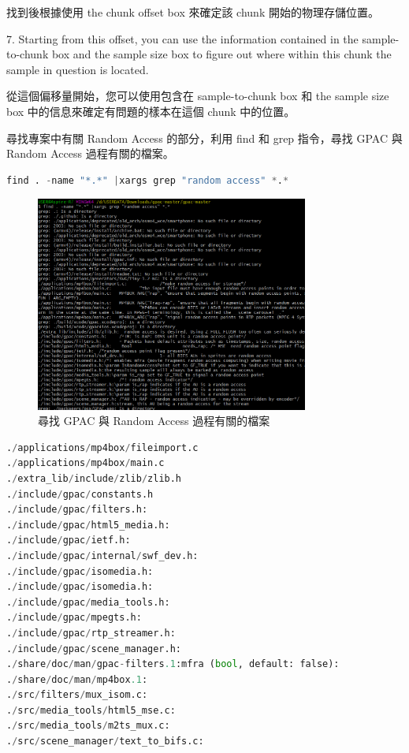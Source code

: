\documentclass[10pt,UTF8]{ctexart}
\begin{document}
找到後根據使用 the chunk offset box 來確定該 chunk 開始的物理存儲位置。

7. Starting from this offset, you can use the information contained in the sample-to-chunk box and the sample size box to figure out where within this chunk the sample in question is located.

從這個偏移量開始，您可以使用包含在 sample-to-chunk box 和 the sample size box 中的信息來確定有問題的樣本在這個 chunk 中的位置。

尋找專案中有關 Random Access 的部分，利用 find 和 grep 指令，尋找 GPAC 與 Random Access 過程有關的檔案。


\begin{lstlisting}[language={python}]
find . -name "*.*" |xargs grep "random access" *.*
\end{lstlisting}

\begin{figure}[H]
\centering 
\includegraphics[width=0.80\textwidth]{g6.png} 
\caption{尋找 GPAC 與 Random Access 過程有關的檔案}
\label{Test}
\end{figure}

\begin{lstlisting}[language={python}]
./applications/mp4box/fileimport.c
./applications/mp4box/main.c
./extra_lib/include/zlib/zlib.h
./include/gpac/constants.h
./include/gpac/filters.h:
./include/gpac/html5_media.h:
./include/gpac/ietf.h:
./include/gpac/internal/swf_dev.h:
./include/gpac/isomedia.h:
./include/gpac/isomedia.h:
./include/gpac/media_tools.h:
./include/gpac/mpegts.h:
./include/gpac/rtp_streamer.h:
./include/gpac/scene_manager.h: 
./share/doc/man/gpac-filters.1:mfra (bool, default: false):
./share/doc/man/mp4box.1:
./src/filters/mux_isom.c:
./src/media_tools/html5_mse.c: 
./src/media_tools/m2ts_mux.c:
./src/scene_manager/text_to_bifs.c:
\end{lstlisting}
\end{document}
